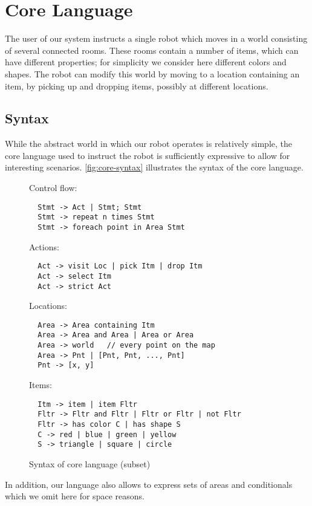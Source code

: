 \section{Core Language}


The user of our system instructs a single robot which moves in a world
consisting of several connected rooms. These rooms contain a number of items,
which can have different properties; for simplicity we consider here different
colors and shapes. The robot can modify this world by moving to a location
containing an item, by picking up and dropping items, possibly at different
locations.

\subsection{Syntax}
While the abstract world in which our robot operates is relatively simple,
the core language used to instruct the robot is sufficiently expressive to
allow for interesting scenarios. \autoref{fig:core-syntax} illustrates the
syntax of the core language.
\begin{figure}
  Control flow:
  \begin{lstlisting}
  Stmt -> Act | Stmt; Stmt
  Stmt -> repeat n times Stmt
  Stmt -> foreach point in Area Stmt
  \end{lstlisting}

  Actions:
  \begin{lstlisting}
  Act -> visit Loc | pick Itm | drop Itm
  Act -> select Itm
  Act -> strict Act
  \end{lstlisting}

  Locations:
  \begin{lstlisting}
  Area -> Area containing Itm
  Area -> Area and Area | Area or Area
  Area -> world   // every point on the map
  Area -> Pnt | [Pnt, Pnt, ..., Pnt]
  Pnt -> [x, y]
  \end{lstlisting}

  Items:
  \begin{lstlisting}
  Itm -> item | item Fltr
  Fltr -> Fltr and Fltr | Fltr or Fltr | not Fltr
  Fltr -> has color C | has shape S
  C -> red | blue | green | yellow
  S -> triangle | square | circle
  \end{lstlisting}
  \caption{Syntax of core language (subset)}
  \label{fig:core-syntax}
\end{figure}
In addition, our language also allows to express sets of areas and
conditionals which we omit here for space reasons.

